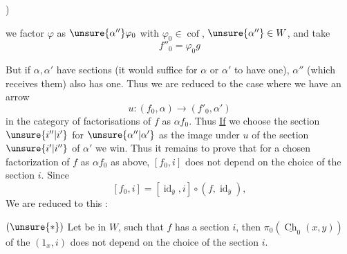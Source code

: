 )


we factor $\varphi$ as $\unsure{\alpha''}\varphi_0$ with $\varphi_0\in\operatorname{cof}$, $\unsure{\alpha''}\in W$, and take
\[f''_0=\varphi_0 g\]

But if $\alpha,\alpha'$ have sections (it would suffice for $\alpha$ or $\alpha'$ to have one),    $\alpha''$ (which receives them) also has one. Thus we are reduced to the case where we have an arrow
\[u:(f_0,\alpha)\longrightarrow(f'_0,\alpha')\]
in the category of factorisations of $f$ as $\alpha f_0$. Thus \uline{If} we choose the section $\unsure{i''|i'}$ for $\unsure{\alpha''|\alpha'}$ as the image under $u$ of the section $\unsure{i'|i''}$ of $\alpha'$ \unsure{,} we win. Thus it remains to prove that
for a chosen factorization of $f$ as $\alpha f_0$ as above, $[f_0,i]$ does not depend on the choice of the section $i$. Since
\[[f_0,i]=[\operatorname{id}_{\bar y},i]\circ(f,\operatorname{id}_{\bar y}),\]
We are reduced to this :

$(\unsure{*})$ Let
be in $W$, such that $f$ has a  section $i$, then    $\pi_0(\underline{\operatorname{Ch}}_0(x,y))$  of the $(1_x,i)$
does not depend on the choice of the section $i$.

